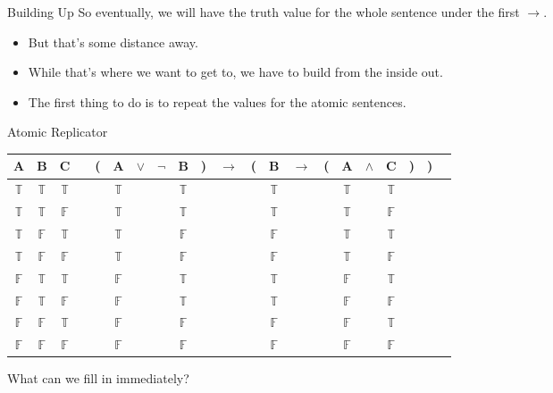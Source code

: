 \documentclass[
  ignorenonframetext,
]{beamer}
\providecommand{\tightlist}{%
  \setlength{\itemsep}{0pt}\setlength{\parskip}{0pt}}
\renewcommand{\,}{\text{, }}
\def\True{\mathbb{T}}
\def\False{\mathbb{F}}
\begin{document}
\begin{frame}{Building Up}
\protect\hypertarget{building-up}{}
So eventually, we will have the truth value for the whole sentence under
the first \(\rightarrow\).

\begin{itemize}
\tightlist
\item
  But that's some distance away.
\item
  While that's where we want to get to, we have to build from the inside
  out.
\item
  The first thing to do is to repeat the values for the atomic
  sentences.
\end{itemize}
\end{frame}

\begin{frame}{Atomic Replicator}
\protect\hypertarget{atomic-replicator}{}
\begin{center}
\begin{tabular}{@{ }c@{ }@{ }c@{ }@{ }c | c@{ }@{}c@{}@{ }c@{ }@{ }c@{ }@{ }c@{ }@{ }c@{ }@{}c@{}@{ }c@{ }@{}c@{}@{ }c@{ }@{ }c@{ }@{}c@{}@{ }c@{ }@{ }c@{ }@{ }c@{ }@{}c@{}@{}c@{}@{ }c}
A & B & C &  & ( & A & $\vee$ & $\neg$ & B & ) & $\rightarrow$ & ( & B & $\rightarrow$ & ( & A & $\wedge$ & C & ) & ) & \\
\hline 
 $\True$ & $\True$ & $\True$ &  &  & $\True$ &&& $\True$ &  &&  & $\True$ &&  & $\True$ && $\True$ &  &  & \\
 $\True$ & $\True$ & $\False$ &  &  & $\True$ &&& $\True$ &  &&  & $\True$ &&  & $\True$ && $\False$ &  &  & \\
 $\True$ & $\False$ & $\True$ &  &  & $\True$ &&& $\False$ &  &&  & $\False$ &&  & $\True$ && $\True$ &  &  & \\
 $\True$ & $\False$ & $\False$ &  &  & $\True$ &&& $\False$ &  &&  & $\False$ &&  & $\True$ && $\False$ &  &  & \\
 $\False$ & $\True$ & $\True$ &  &  & $\False$ &&& $\True$ &  &&  & $\True$ &&  & $\False$ && $\True$ &  &  & \\
 $\False$ & $\True$ & $\False$ &  &  & $\False$ &&& $\True$ &  &&  & $\True$ &&  & $\False$ && $\False$ &  &  & \\
 $\False$ & $\False$ & $\True$ &  &  & $\False$ &&& $\False$ &  &&  & $\False$ &&  & $\False$ && $\True$ &  &  & \\
 $\False$ & $\False$ & $\False$ &  &  & $\False$ &&& $\False$ &  &&  & $\False$ &&  & $\False$ && $\False$ &  &  & \\
\end{tabular}
\end{center}

What can we fill in immediately?
\end{frame}
\end{document}
